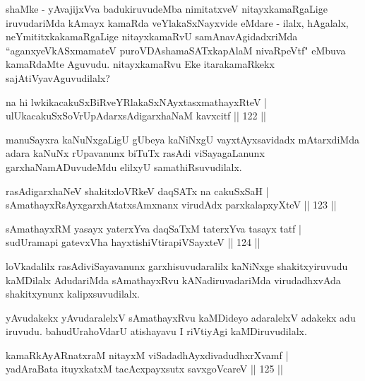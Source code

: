 \begin{artha}
shaMke - yAvajijxVva badukiruvudeMba nimitatxveV nitayxkamaRgaLige iruvudariMda kAmayx kamaRda veYlakaSxNayxvide eMdare - ilalx, hAgalalx, neYmititxkakamaRgaLige nitayxkamaRvU samAnavAgidadxriMda ``aganxyeVkASxmamateV puroVDAshamaSATxkapAlaM nivaRpeVtf" eMbuva kamaRdaMte Aguvudu. nitayxkamaRvu Eke itarakamaRkekx sajAtiVyavAguvudilalx?
\end{artha}

\begin{shl}
na hi lwkikacakuSxBiRveYRlakaSxNAyxtasxmathayxRteV |\\
ulUkacakuSxSoV\s rUpAdarxsAdigarxhaNaM kavxcitf \hfill || 122 ||
\end{shl}

\begin{artha}
manuSayxra kaNuNxgaLigU gUbeya kaNiNxgU vayxtAyxsavidadx mAtarxdiMda adara kaNuNx rUpavanunx biTuTx rasAdi viSayagaLanunx garxhaNamADuvudeMdu elilxyU samathiRsuvudilalx.
\end{artha}


\begin{shl}
rasAdigarxhaNeV shakitxloVRkeV daqSATx na cakuSxSaH |\\
sAmathayxRsAyxgarxhAtatxsAmxnanx virudAdx parxkalapxyXteV \hfill || 123 ||
\end{shl}

\begin{shl}
sAmathayxRM yasayx yaterxYva daqSaTxM taterxYva tasayx tatf |\\
sudUramapi gatevxVha hayxtishiVtirapiVSayxteV \hfill || 124 ||
\end{shl}

\begin{artha}
loVkadalilx rasAdiviSayavanunx garxhisuvudaralilx kaNiNxge shakitxyiruvudu kaMDilalx AdudariMda sAmathayxRvu kANadiruvadariMda virudadhxvAda shakitxynunx kalipxsuvudilalx.
\end{artha}

\begin{artha}
yAvudakekx yAvudaralelxV sAmathayxRvu kaMDideyo adaralelxV adakekx adu iruvudu. bahudUrahoVdarU atishayavu I riVtiyAgi kaMDiruvudilalx.
\end{artha}

\begin{shl}
kamaRkAyARnatxraM nitayxM viSadadhAyxdivadudhxrXvamf |\\
yadAraBata ituyxkatxM tacAcxpayxsutx savxgoVcareV \hfill || 125 ||
\end{shl}

